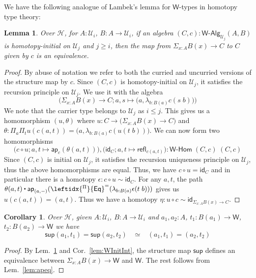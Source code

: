 \documentclass[11pt]{article}
\newcommand{\comp}{\circ}
\newcommand{\idfun}[1]{\mathsf{id}_{#1}}
\newcommand{\prd}[1]{\Pi_{#1}}
\newcommand{\sm}[1]{\Sigma_{#1}}
\newcommand{\lam}[1]{\lambda_{#1}}
\newcommand{\refl}{\mathsf{refl}}
\newcommand{\W}{\mathsf{W}}
\newcommand{\wsup}{\mathsf{sup}}
\newcommand{\funext}{\leftidx{^\Pi}{\mathsf{Eq}}^{=}}
\newcommand{\UU}{\mathcal{U}}
\newcommand{\WAlg}{\mathsf{W}\text{-}\mathsf{Alg}}
\newcommand{\WHom}{\mathsf{W}\text{-}\mathsf{Hom}}
\newcommand{\app}{\mathsf{ap}}
\newcommand{\Hint}{\mathcal{H}}
\newcommand{\ct}{%
  \mathchoice{\mathbin{\raisebox{0.5ex}{$\displaystyle\centerdot$}}}%
             {\mathbin{\raisebox{0.5ex}{$\centerdot$}}}%
             {\mathbin{\raisebox{0.25ex}{$\scriptstyle\,\centerdot\,$}}}%
             {\mathbin{\raisebox{0.1ex}{$\scriptscriptstyle\,\centerdot\,$}}}}
\newtheorem{lemma}[theorem]{Lemma}
\newtheorem{corollary}[theorem]{Corollary}
\theoremstyle{definition}
\begin{document}
We have the following analogue of Lambek's lemma for $\W$-types in homotopy type theory:
\begin{lemma}\label{lem:IntLambek}
Over $\Hint$, for $A:\UU_i$, $B : A \to \UU_i$, if an algebra $(C,c) : \WAlg_{\UU_j}(A,B)$ is homotopy-initial on $\UU_j$ and $j \geq i$, then the map from $\sm{x:A} B(x) \to C$ to $C$ given by $c$ is an equivalence.
\end{lemma}
\begin{proof}
By abuse of notation we refer to both the curried and uncurried versions of the structure map by $c$. Since $(C,c)$ is homotopy-initial on $\UU_j$, it satisfies the recursion principle on $\UU_j$. We use it with the algebra \[\Big(\sm{x:A} B(x) \to C; a,s \mapsto \big(a,\lam{b:B(a)} c(s\;b)\big)\Big)\]
We note that the carrier type belongs to $\UU_j$ as $i \leq j$. This gives us a homomorphism $(u,\theta)$ where $u : C \to \big(\sm{x:A} B(x) \to C\big)$ and $\theta : \prd{a}\prd{t} u(c(a,t)) = \big(a,\lam{b:B(a)} c(u(t\;b))\big)$.  We can now form two homomorphisms
\[\big(c \comp u; a,t \mapsto \app_c(\theta(a,t))\big), \big(\idfun{C}; a,t \mapsto \refl_{c(a,t)}\big) : \WHom \; (C,c) \; (C,c)\]
Since $(C,c)$ is initial on $\UU_j$, it satisfies the recursion uniqueness principle on $\UU_j$, thus the above homomorphisms are equal. Thus, we have $c \comp u = \idfun{C}$ and in particular there is a homotopy $\epsilon : c \comp u \sim \idfun{C}$. For any $a,t$, the path $\theta(a,t) \ct \app_{(a,-)}(\funext(\lam{b:B(a)} \epsilon(t\;b)))$ gives us $u(c(a,t)) = (a,t)$. Thus we have a homotopy $\eta : u \comp c \sim \idfun{\sm{x:A} B(x) \to C}$.
\end{proof}

\begin{corollary}\label{lem:suppath}
Over $\Hint$, given $A:\UU_i$, $B : A \to \UU_i$ and $a_1,a_2:A$, $t_1 : B(a_1) \to \W$, $t_2 : B(a_2) \to \W$ we have
\[ \wsup(a_1,t_1) = \wsup(a_2,t_2) \;\;\; \simeq \;\;\; (a_1,t_1) = (a_2,t_2)\]
\end{corollary}
\begin{proof}
By Lem.~\ref{lem:IntLambek} and Cor.~\ref{lem:WInitInt}, the structure map $\wsup$ defines an equivalence between $\sm{x:A} B(x) \to \W$ and $\W$. The rest follows from Lem.~\ref{lem:apeq}.
\end{proof}
\end{document}
